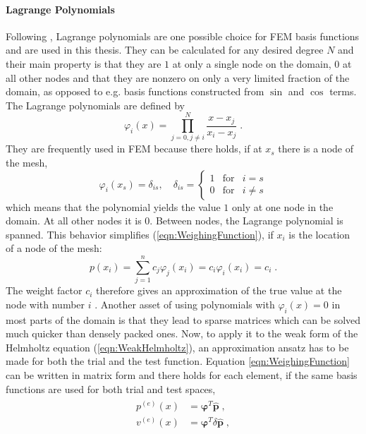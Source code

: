 \documentclass[%
  a4paper,oneside,%
  11pt,%
  smallchapters,
  style=printdev,
  extramargin,
  green,%
  rgb, <cmyk>
  ]{tubsbook}
\begin{document}
\paragraph{Lagrange Polynomials}
Following \cite{langtangen2019}, Lagrange polynomials are one possible choice for FEM basis functions and are used in this thesis. They can be calculated for any desired degree $N$ and their main property is that they are $1$ at only a single node on the domain, $0$ at all other nodes and that they are nonzero on only a very limited fraction of the domain, as opposed to e.g. basis functions constructed from $\sin$ and $\cos$ terms. The Lagrange polynomials are defined by
\begin{equation}
\varphi_i(x) = \prod_{j=0,j\neq i}^N \frac{x-x_j}{x_i-x_j} \;.
\end{equation}
They are frequently used in FEM because there holds, if at $x_s$ there is a node of the mesh,
\begin{equation}
\varphi_i(x_s) = \delta_{is}, \quad \delta_{is}  =     \left\{ \begin{array}{rcl} 1 & \mbox{for}& i = s  \\ 0 & \mbox{for} & i \neq s\end{array}\right .
\end{equation}
which means that the polynomial yields the value $1$ only at one node in the domain. At all other nodes it is $0$. Between nodes, the Lagrange polynomial is spanned. This behavior simplifies (\ref{eqn:WeighingFunction}), if $x_i$ is the location of a node of the mesh:
\begin{equation}
p(x_i) = \sum_{j = 1}^n c_j  \varphi_j(x_i) = c_i \varphi_i(x_i) = c_i \;.
\end{equation}
The weight factor $c_i$ therefore gives an approximation of the true value at the node with number $i$ \cite[pp. 78, 79]{langtangen2019}. 
Another asset of using polynomials with $\varphi_i(x) = 0$ in most parts of the domain is that they lead to sparse matrices which can be solved much quicker than densely packed ones.
%
Now, to apply it to the weak form of the Helmholtz equation (\ref{eqn:WeakHelmholtz}), an approximation ansatz has to be made for both the trial and the test function. Equation \eqref{eqn:WeighingFunction} can be written in matrix form and there holds for each element, if the same basis functions are used for both trial and test spaces,
\begin{align}
\begin{split}
p^{(e)}(x) &= \bm{\varphi}^T \hat{\bm{p}} \;, \\
v^{(e)}(x) &= \bm{\varphi}^T \delta\hat{\bm{p}}\;,
\end{split}
\label{eqn:FEMAnsatz}
\end{align}
\end{document}
